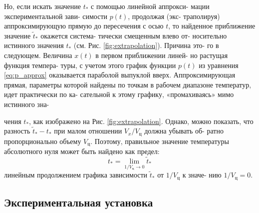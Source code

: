 \documentclass[12pt]{article}
\begin{document}
\setlength{\parindent}{1.5em}
Но, если искать значение $t_{*}$
с помощью линейной аппрокси-
мации экспериментальной зави-
симости $p(t)$, продолжая (экс-
траполируя) аппроксимирующую
прямую до пересечения с осью
$t$, то найденное приближение
значение $\tilde{t}_{*}$ окажется система-
тически смещенным влево от-
носительно истинного значения
$t_{*}$ (см. Рис. \ref{fig:extrapolation}). Причина это-
го в следующем. Величина $x(t)$
в первом приближении линей-
но растущая функция темпера-
туры, с учетом этого график
функции $p(t)$ из уравнения \eqref{eq:p_approx} оказывается параболой выпуклой
вверх. Аппроксимирующая прямая, параметры которой найдены по
точкам в рабочем диапазоне температур, идет практически по ка-
сательной к этому графику, «промахиваясь» мимо истинного зна-

\vfill %

\newpage
\vspace{1em} %

\setlength{\parindent}{1.5em} %

чения $t_{*}$, как изображено на Рис. \ref{fig:extrapolation}. Однако, можно показать, что
разность $\tilde{t}_{*} - t_{*}$ при малом отношении $V_x/V_{\text{ц}}$ должна убывать об-
ратно пропорционально объему $V_{\text{ц}}$. Поэтому, правильное значение
температуры абсолютного нуля может быть найдено как предел:
\begin{equation} \label{eq:limit_t_star}
t_{*} = \lim_{1/V_{\text{ц}} \to 0} \tilde{t}_{*}
\end{equation}
линейным продолжением графика зависимости $\tilde{t}_{*}$ от $1/V_{\text{ц}}$ к значе-
нию $1/V_{\text{ц}} = 0$.

\vfill

\newpage
\vspace{2em} %

\begin{center}
    \section*{Экспериментальная установка}
\end{center}

\setlength{\parindent}{1.5em} %
\end{document}
